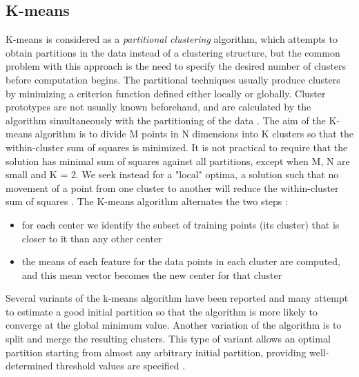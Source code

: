 \documentclass[letterpaper, 10 pt, conference]{ieeeconf}  %
\begin{document}
\subsection{K-means}
K-means is considered as a \textit{partitional
clustering} algorithm, which attempts to obtain partitions in the data instead of a clustering structure, but the common problem with this approach is the need to specify the desired number of clusters before computation begins. The partitional techniques usually produce clusters by minimizing a criterion function defined either locally or globally. Cluster prototypes are not usually known beforehand,
and are calculated by the algorithm simultaneously with the partitioning of the data \cite{Scott2006}. The aim of the K-means algorithm is to divide M points in N
dimensions into K clusters so that the within-cluster sum of squares is minimized. It is not practical to require that the solution has minimal sum of squares against all partitions,
except when M, N are small and K = 2. We seek instead for a "local" optima, a solution such that no movement of a point from one cluster to another will reduce the within-cluster sum of squares \cite{Ramasubramanian2017}. The K-means algorithm alternates the two steps \cite{Hastie2009}:
\begin{itemize}
\item  for each center we identify the  subset of training points (its cluster)
that is closer to it than any other center
\item the means of each feature for the data points in each cluster are
computed, and this mean vector becomes the new center for that cluster
\end{itemize}
Several variants of the k-means algorithm have been reported and many attempt to estimate a good initial partition so that the algorithm is more likely to converge at the global minimum value. Another variation of the algorithm is to split and merge the resulting clusters. This type of variant allows an optimal partition starting from almost any arbitrary initial partition, providing well-determined threshold values are
specified \cite{Scott2006}.
\end{document}
